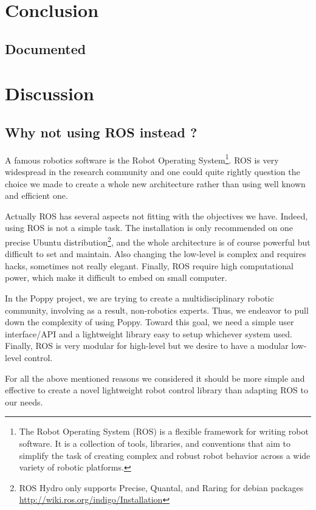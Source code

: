 \section{Conclusion} %


\subsection{Documented} %


\section{Discussion} %

\subsection{Why not using ROS instead ?} %

A famous robotics software is the Robot Operating System\footnote{The Robot Operating System (ROS) is a flexible framework for writing robot software. It is a collection of tools, libraries, and conventions that aim to simplify the task of creating complex and robust robot behavior across a wide variety of robotic platforms.}. ROS is very widespread in the research community and one could quite rightly question the choice we made to create a whole new architecture rather than using well known and efficient one.

Actually ROS has several aspects not fitting with the objectives we have. Indeed, using ROS is not a simple task. The installation is only recommended on one precise Ubuntu distribution\footnote{ROS Hydro only supports Precise, Quantal, and Raring for debian packages \url{http://wiki.ros.org/indigo/Installation}}, and the whole architecture is of course powerful but difficult to set and maintain. Also changing the low-level is complex and requires hacks, sometimes not really elegant. Finally, ROS require high computational power, which make it difficult to embed on small computer.

In the Poppy project, we are trying to create a multidisciplinary robotic community, involving as a result, non-robotics experts. Thus, we endeavor to pull down the complexity of using Poppy. Toward this goal, we need a simple user interface/API and a lightweight library easy to setup whichever system used. Finally, ROS is very modular for high-level but we desire to have a modular low-level control.

For all the above mentioned reasons we considered it should be more simple and effective to create a novel lightweight robot control library than adapting ROS to our needs.
